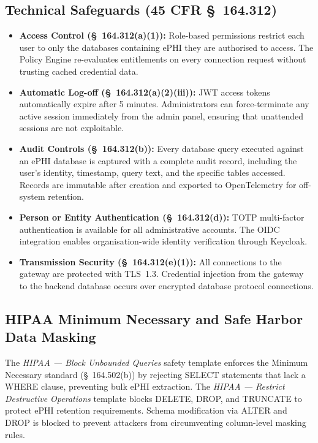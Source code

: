 \subsection{Technical Safeguards (45 CFR \S~164.312)}

\begin{itemize}
    \item \textbf{Access Control (\S~164.312(a)(1)):} Role-based permissions restrict each user to only the databases containing ePHI they are authorised to access. The Policy Engine re-evaluates entitlements on every connection request without trusting cached credential data.
    \item \textbf{Automatic Log-off (\S~164.312(a)(2)(iii)):} JWT access tokens automatically expire after 5 minutes. Administrators can force-terminate any active session immediately from the admin panel, ensuring that unattended sessions are not exploitable.
    \item \textbf{Audit Controls (\S~164.312(b)):} Every database query executed against an ePHI database is captured with a complete audit record, including the user's identity, timestamp, query text, and the specific tables accessed. Records are immutable after creation and exported to OpenTelemetry for off-system retention.
    \item \textbf{Person or Entity Authentication (\S~164.312(d)):} TOTP multi-factor authentication is available for all administrative accounts. The OIDC integration enables organisation-wide identity verification through Keycloak.
    \item \textbf{Transmission Security (\S~164.312(e)(1)):} All connections to the gateway are protected with TLS~1.3. Credential injection from the gateway to the backend database occurs over encrypted database protocol connections.
\end{itemize}

\subsection{HIPAA Minimum Necessary and Safe Harbor Data Masking}

The \textit{HIPAA --- Block Unbounded Queries} safety template enforces the Minimum Necessary standard (\S~164.502(b)) by rejecting SELECT statements that lack a WHERE clause, preventing bulk ePHI extraction. The \textit{HIPAA --- Restrict Destructive Operations} template blocks DELETE, DROP, and TRUNCATE to protect ePHI retention requirements. Schema modification via ALTER and DROP is blocked to prevent attackers from circumventing column-level masking rules.


